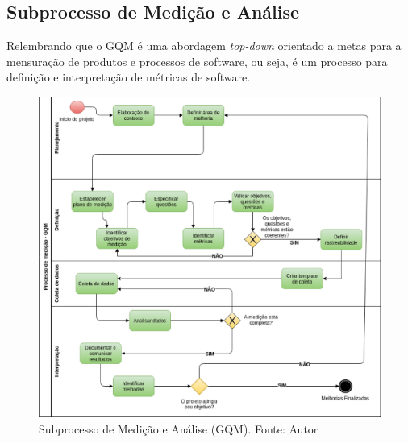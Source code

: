 \subsection{Subprocesso de Medição e Análise}

Relembrando que o GQM é uma abordagem \textit{top-down} orientado a metas para a mensuração de produtos e processos de software, ou seja, é um processo para definição e interpretação de métricas de software. \cite{junior}

\begin{figure}[H]
	\centering
  \includegraphics[keepaspectratio=true,scale=0.5]{figuras/processo_gqm.eps}
  \caption[Subprocesso de Medição e Análise (GQM).]{Subprocesso de Medição e Análise (GQM). Fonte: Autor}
	\label{fig:gqm}
\end{figure}

